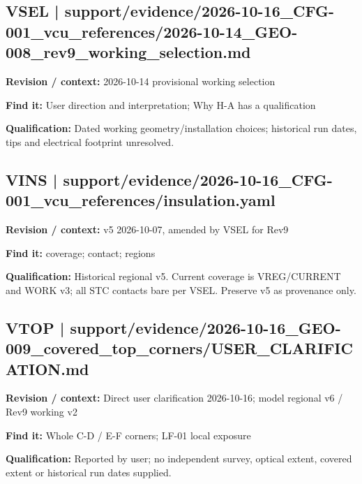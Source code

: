 \documentclass[11pt]{article}
\begin{document}
\par\noindent\begin{minipage}{\textwidth}\small
\subsection*{VSEL | support/evidence/2026-10-16\_\allowbreak{}CFG-001\_\allowbreak{}vcu\_\allowbreak{}references/2026-10-14\_\allowbreak{}GEO-008\_\allowbreak{}rev9\_\allowbreak{}working\_\allowbreak{}selection.md}
\textbf{Revision / context:} 2026-10-14 provisional working selection\par
\textbf{Find it:} User direction and interpretation; Why H-A has a qualification\par
\textbf{Qualification:} Dated working geometry/installation choices; historical run dates, tips and electrical footprint unresolved.\par
\end{minipage}\par\vspace{5pt}
\par
\par\noindent\begin{minipage}{\textwidth}\small
\subsection*{VINS | support/evidence/2026-10-16\_\allowbreak{}CFG-001\_\allowbreak{}vcu\_\allowbreak{}references/insulation.yaml}
\textbf{Revision / context:} v5 2026-10-07, amended by VSEL for Rev9\par
\textbf{Find it:} coverage; contact; regions\par
\textbf{Qualification:} Historical regional v5. Current coverage is VREG/CURRENT and WORK v3; all STC contacts bare per VSEL. Preserve v5 as provenance only.\par
\end{minipage}\par\vspace{5pt}
\par\noindent\begin{minipage}{\textwidth}\small
\subsection*{VTOP | support/evidence/2026-10-16\_\allowbreak{}GEO-009\_\allowbreak{}covered\_\allowbreak{}top\_\allowbreak{}corners/USER\_\allowbreak{}CLARIFICATION.md}
\textbf{Revision / context:} Direct user clarification 2026-10-16; model regional v6 / Rev9 working v2\par
\textbf{Find it:} Whole C-D / E-F corners; LF-01 local exposure\par
\textbf{Qualification:} Reported by user; no independent survey, optical extent, covered extent or historical run dates supplied.\par
\end{minipage}\par\vspace{5pt}
\end{document}
